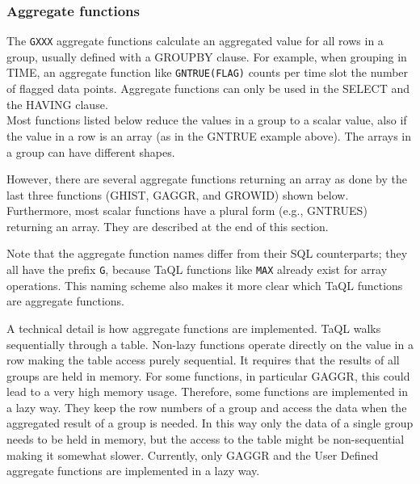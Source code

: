 \subsubsection{\label{TAQL:AGGRFUNC}Aggregate functions}
The \texttt{GXXX} aggregate functions calculate an aggregated value
for all rows in a group, usually defined with a GROUPBY clause.
For example, when grouping in TIME, an aggregate function like
\texttt{GNTRUE(FLAG)} counts per time slot the number of flagged data
points. 
Aggregate functions can only be used in the SELECT and the HAVING clause. 
\\Most functions listed below reduce the values in a group to a scalar
value, also if the value in a row is an array (as in the GNTRUE
example above). The arrays in a group can have different shapes.

However, there are several aggregate functions returning an array as
done by the last three functions (GHIST, GAGGR, and GROWID) shown below.
Furthermore, most scalar functions have a plural form (e.g., GNTRUES) returning an
array. They are described at the end of this section.

Note that the aggregate function names differ from their SQL counterparts;
they all have the prefix \texttt{G}, because TaQL functions like
\texttt{MAX} already exist for array operations. This naming scheme
also makes it more clear which TaQL functions are aggregate functions.

A technical detail is how aggregate functions are
implemented. TaQL walks sequentially through a table. Non-lazy
functions operate directly on the value in a row making the table
access purely sequential. It requires that the results of all groups
are held in memory. For some functions, in particular GAGGR, this
could lead to a very high memory usage. Therefore, some functions are
implemented in a lazy way. They 
keep the row numbers of a group and access the data when the
aggregated result of a group is needed. In this way only the data of a
single group needs to be held in memory, but the access to the table
might be non-sequential making it somewhat slower.
Currently, only GAGGR and the User Defined aggregate functions are
implemented in a lazy way. 

